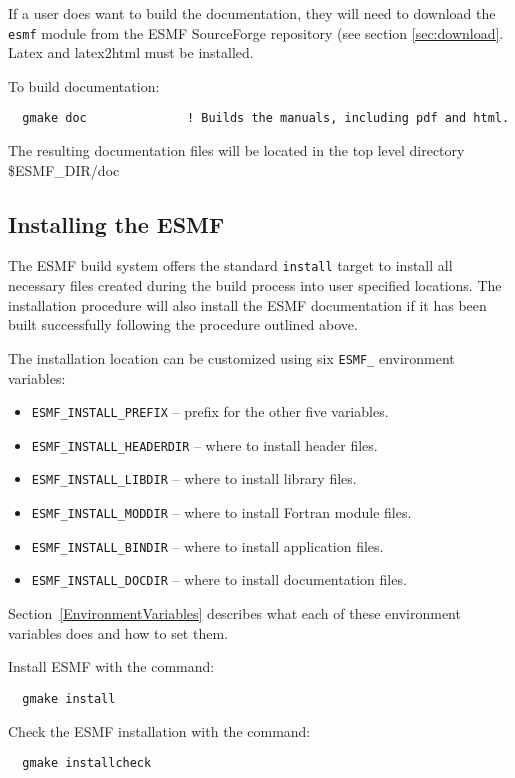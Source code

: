 If a user does want to build the documentation, they will need to 
download the {\tt esmf} module from the ESMF SourceForge repository
(see section \ref{sec:download}.  Latex and latex2html must be
installed.

\noindent To build documentation:
\begin{verbatim}
  gmake doc              ! Builds the manuals, including pdf and html.
\end{verbatim}

\noindent The resulting documentation files will be
located in the top level directory \${ESMF\_DIR}/doc

\subsection{Installing the ESMF}
\label{InstallESMF}

The ESMF build system offers the standard {\tt install} target to install all
necessary files created during the build process into user specified locations.
The installation procedure will also install the ESMF documentation if it has
been built successfully following the procedure outlined above.

The installation location can be customized using six {\tt ESMF\_} environment
variables:
\begin{itemize}
\item {\tt ESMF\_INSTALL\_PREFIX} -- prefix for the other five variables.
\item {\tt ESMF\_INSTALL\_HEADERDIR} -- where to install header files.
\item {\tt ESMF\_INSTALL\_LIBDIR} -- where to install library files.
\item {\tt ESMF\_INSTALL\_MODDIR} -- where to install Fortran module files.
\item {\tt ESMF\_INSTALL\_BINDIR} -- where to install application files.
\item {\tt ESMF\_INSTALL\_DOCDIR} -- where to install documentation files.
\end{itemize}

Section~\ref{EnvironmentVariables} describes what each of these 
environment variables does and how to set them.

Install ESMF with the command:
\begin{verbatim}
  gmake install
\end{verbatim}

Check the ESMF installation with the command:
\begin{verbatim}
  gmake installcheck
\end{verbatim}

